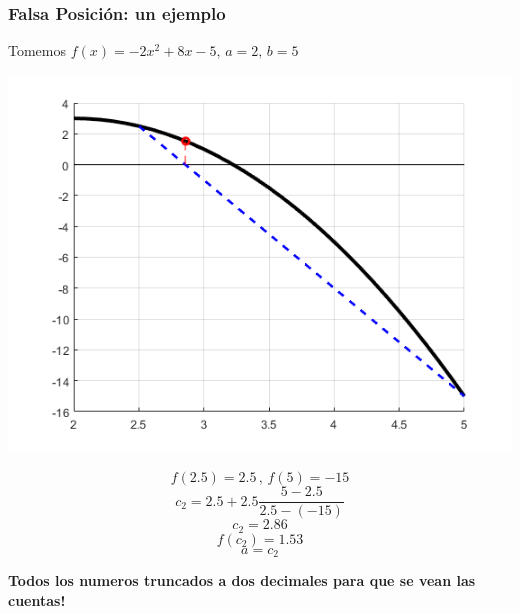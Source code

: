 \documentclass[xcolor=svgnames]{beamer} %
\theoremstyle{plain}
\renewcommand{\textbf}[1]{{\bfseries\textcolor{redUnq2}{#1}}}
\theoremstyle{definition}
\begin{document}
\begin{frame}
\frametitle{Falsa Posición: un ejemplo}
Tomemos $f(x) = -2x^2+8x-5, \, a=2, \, b=5$
\begin{minipage}{.65\linewidth}
\includegraphics[scale=.45]{FalsaPosicion/f2.png} 
\end{minipage}
\begin{minipage}{.25\linewidth}
$$f(2.5)=2.5 \,,\,f(5)=-15$$\vspace{7pt}
$$c_2 = 2.5 +2.5\frac{5-2.5}{2.5-(-15)}$$
$$c_2 = 2.86 $$
$$f(c_2) = 1.53 $$
$$ a = c_2$$\vspace{-5pt}

\end{minipage}\vspace{-5pt}
\textbf{Todos los numeros truncados a dos decimales para que se vean las cuentas!}

\end{frame}
\end{document}
